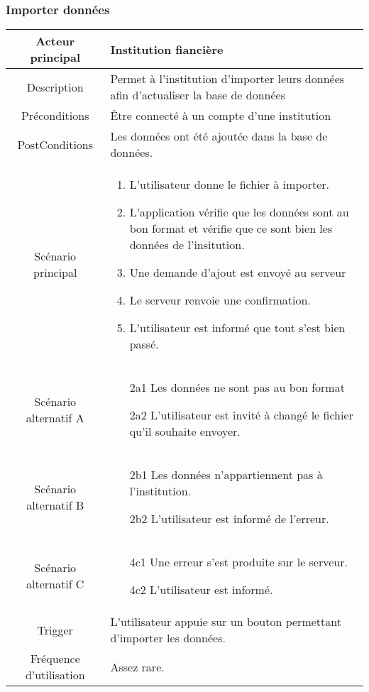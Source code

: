 \documentclass{article}
\begin{document}
\subsubsection{Importer données}
\begin{table}[h]
   \begin{tabular}{|c|p{10cm}|}
      \hline
      Acteur principal&Institution fiancière\\
      \hline
      Description&Permet à l'institution d'importer leurs données afin d'actualiser la base de données\\
      \hline
      Préconditions&Être connecté à un compte d'une institution\\
      \hline
      PostConditions&Les données ont été ajoutée dans la base de données.\\
      \hline
      Scénario principal& 
            \begin{enumerate}
               \item L'utilisateur donne le fichier à importer.
               \item L'application vérifie que les données sont au bon format et vérifie que ce sont bien les données de l'insitution.
               \item Une demande d'ajout est envoyé au serveur
               \item Le serveur renvoie une confirmation.
               \item L'utilisateur est informé que tout s'est bien passé.
            \end{enumerate}     \\
      \hline
      Scénario alternatif A&
            \begin{itemize}
               \item[2a1] Les données ne sont pas au bon format
               \item[2a2] L'utilisateur est invité à changé le fichier qu'il souhaite envoyer.  
            \end{itemize}      \\
      \hline
      Scénario alternatif B&
            \begin{itemize}
               \item[2b1] Les données n'appartiennent pas à l'institution.
               \item[2b2] L'utilisateur est informé de l'erreur.  
            \end{itemize}\\
      \hline
      Scénario alternatif C&
            \begin{itemize}
               \item[4c1] Une erreur s'est produite sur le serveur.
               \item[4c2] L'utilisateur est informé.  
            \end{itemize} \\
      \hline
      Trigger&L'utilisateur appuie sur un bouton permettant d'importer les données.\\
      \hline
      Fréquence d'utilisation&Assez rare.\\
      \hline
   \end{tabular}
\end{table}
\end{document}

